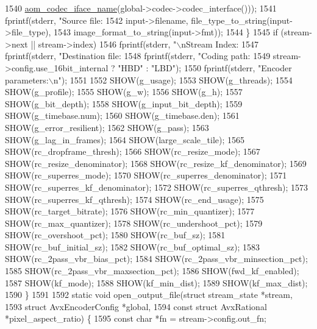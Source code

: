 \begin{DoxyCodeInclude}
{{{{{{{{{{{{{{{{{{{{{{{{{{1540             \hyperlink{group__codec_ga013b1f6d96b2cf9489396311a7e5179b}{aom\_codec\_iface\_name}(global->codec->codec\_interface()));
1541     fprintf(stderr, \textcolor{stringliteral}{"Source file: %
1542             input->filename, file\_type\_to\_string(input->file\_type),
1543             image\_format\_to\_string(input->fmt));
1544   \}
1545   \textcolor{keywordflow}{if} (stream->next || stream->index)
1546     fprintf(stderr, \textcolor{stringliteral}{"\(\backslash\)nStream Index: %
1547   fprintf(stderr, \textcolor{stringliteral}{"Destination file: %
1548   fprintf(stderr, \textcolor{stringliteral}{"Coding path: %
1549           stream->config.use\_16bit\_internal ? \textcolor{stringliteral}{"HBD"} : \textcolor{stringliteral}{"LBD"});
1550   fprintf(stderr, \textcolor{stringliteral}{"Encoder parameters:\(\backslash\)n"});
1551 
1552   SHOW(g\_usage);
1553   SHOW(g\_threads);
1554   SHOW(g\_profile);
1555   SHOW(g\_w);
1556   SHOW(g\_h);
1557   SHOW(g\_bit\_depth);
1558   SHOW(g\_input\_bit\_depth);
1559   SHOW(g\_timebase.num);
1560   SHOW(g\_timebase.den);
1561   SHOW(g\_error\_resilient);
1562   SHOW(g\_pass);
1563   SHOW(g\_lag\_in\_frames);
1564   SHOW(large\_scale\_tile);
1565   SHOW(rc\_dropframe\_thresh);
1566   SHOW(rc\_resize\_mode);
1567   SHOW(rc\_resize\_denominator);
1568   SHOW(rc\_resize\_kf\_denominator);
1569   SHOW(rc\_superres\_mode);
1570   SHOW(rc\_superres\_denominator);
1571   SHOW(rc\_superres\_kf\_denominator);
1572   SHOW(rc\_superres\_qthresh);
1573   SHOW(rc\_superres\_kf\_qthresh);
1574   SHOW(rc\_end\_usage);
1575   SHOW(rc\_target\_bitrate);
1576   SHOW(rc\_min\_quantizer);
1577   SHOW(rc\_max\_quantizer);
1578   SHOW(rc\_undershoot\_pct);
1579   SHOW(rc\_overshoot\_pct);
1580   SHOW(rc\_buf\_sz);
1581   SHOW(rc\_buf\_initial\_sz);
1582   SHOW(rc\_buf\_optimal\_sz);
1583   SHOW(rc\_2pass\_vbr\_bias\_pct);
1584   SHOW(rc\_2pass\_vbr\_minsection\_pct);
1585   SHOW(rc\_2pass\_vbr\_maxsection\_pct);
1586   SHOW(fwd\_kf\_enabled);
1587   SHOW(kf\_mode);
1588   SHOW(kf\_min\_dist);
1589   SHOW(kf\_max\_dist);
1590 \}
1591 
1592 \textcolor{keyword}{static} \textcolor{keywordtype}{void} open\_output\_file(\textcolor{keyword}{struct} stream\_state *stream,
1593                              \textcolor{keyword}{struct} AvxEncoderConfig *global,
1594                              \textcolor{keyword}{const} \textcolor{keyword}{struct} AvxRational *pixel\_aspect\_ratio) \{
1595   \textcolor{keyword}{const} \textcolor{keywordtype}{char} *fn = stream->config.out\_fn;
}}}}}}}}}}}}}}}}}}}}}}}}}}}}}}
\end{DoxyCodeInclude}
